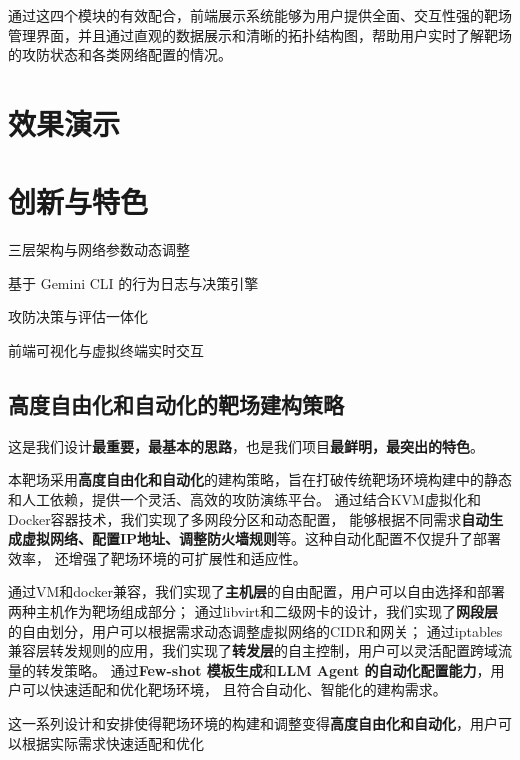 \documentclass[lang=cn,10pt]{elegantbook}
\begin{document}
通过这四个模块的有效配合，前端展示系统能够为用户提供全面、交互性强的靶场管理界面，并且通过直观的数据展示和清晰的拓扑结构图，帮助用户实时了解靶场的攻防状态和各类网络配置的情况。



\chapter{效果演示}



\chapter{创新与特色}
\begin{introduction}
  \item 三层架构与网络参数动态调整
  \item 基于 Gemini CLI 的行为日志与决策引擎
  \item 攻防决策与评估一体化
  \item 前端可视化与虚拟终端实时交互
\end{introduction}

\section{高度自由化和自动化的靶场建构策略}
这是我们设计\textbf{最重要，最基本的思路}，也是我们项目\textbf{最鲜明，最突出的特色}。

本靶场采用\textbf{高度自由化和自动化}的建构策略，旨在打破传统靶场环境构建中的静态和人工依赖，提供一个灵活、高效的攻防演练平台。
通过结合KVM虚拟化和Docker容器技术，我们实现了多网段分区和动态配置，
能够根据不同需求\textbf{自动生成虚拟网络、配置IP地址、调整防火墙规则}等。这种自动化配置不仅提升了部署效率，
还增强了靶场环境的可扩展性和适应性。

通过VM和docker兼容，我们实现了\textbf{主机层}的自由配置，用户可以自由选择和部署两种主机作为靶场组成部分；
通过libvirt和二级网卡的设计，我们实现了\textbf{网段层}的自由划分，用户可以根据需求动态调整虚拟网络的CIDR和网关；
通过iptables兼容层转发规则的应用，我们实现了\textbf{转发层}的自主控制，用户可以灵活配置跨域流量的转发策略。
通过\textbf{Few-shot 模板生成}和\textbf{LLM Agent 的自动化配置能力}，用户可以快速适配和优化靶场环境，
且符合自动化、智能化的建构需求。


这一系列设计和安排使得靶场环境的构建和调整变得\textbf{高度自由化和自动化}，用户可以根据实际需求快速适配和优化
\end{document}
